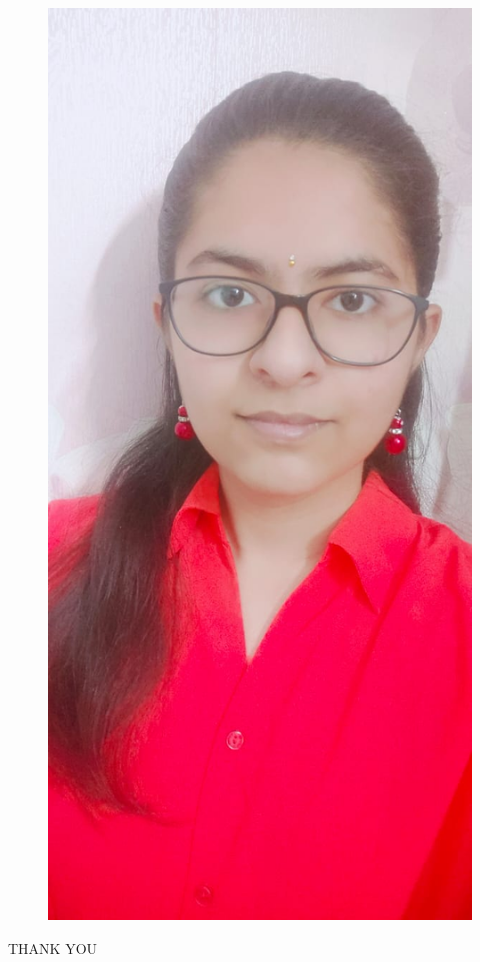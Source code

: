 \documentclass[15pt]{beamer}
\begin{document}
\begin{frame}
\begin{figure}
		    \includegraphics[width=0.2\linewidth]{tushara.jpeg}
		    \end{figure}
    \end{frame}

    \begin{frame}
    \begin{center}
         THANK YOU
    \end{center}
    \end{frame}
\end{document}
